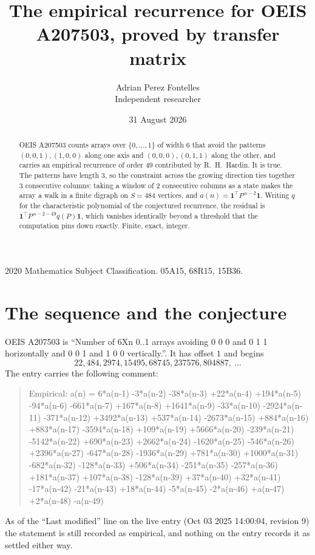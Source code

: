 \documentclass[11pt,a4paper]{article}
\title{The empirical recurrence for OEIS A207503, proved by transfer matrix}
\author{Adrian Perez Fontelles\\ \small Independent researcher}
\date{31 August 2026}
\theoremstyle{plain}
\theoremstyle{definition}
\begin{document}
\maketitle

\begin{abstract}
OEIS A207503 counts arrays over $\{0,\dots,1\}$ of width $6$ that avoid the patterns
$(0,0,1), (1,0,0)$ along one axis and $(0,0,0), (0,1,1)$ along the other, and carries an empirical recurrence of
order $49$ contributed by R.~H.~Hardin. It is true. The patterns have length $3$, so
the constraint across the growing direction ties together $3$ consecutive columns: taking a
window of $2$ consecutive columns as a state makes the array a walk in a finite digraph
on $S=484$ vertices, and $a(n)=\mathbf{1}^{\!\top}P^{\,n-2}\mathbf{1}$. Writing $q$
for the characteristic polynomial of the conjectured recurrence, the residual is
$\mathbf{1}^{\!\top}P^{\,n-2-49}q(P)\mathbf{1}$, which vanishes identically
beyond a threshold that the computation pins down exactly. Finite, exact, integer.
\end{abstract}

\noindent\small 2020 Mathematics Subject Classification. 05A15, 68R15, 15B36.\normalsize

\section{The sequence and the conjecture}

OEIS A207503 is ``Number of 6Xn 0..1 arrays avoiding 0 0 0 and 0 1 1 horizontally and 0 0 1 and 1 0 0 vertically.''. It has offset
$1$ and begins
\[
22, 484, 2974, 15495, 68745, 237576, 804887,\ \dots
\]
The entry carries the following comment:
\begin{quote}\small
Empirical: a(n) = 6*a(n-1) -3*a(n-2) -38*a(n-3) +22*a(n-4) +194*a(n-5) -94*a(n-6) -661*a(n-7) +167*a(n-8) +1641*a(n-9) -33*a(n-10) -2924*a(n-11) -371*a(n-12) +3492*a(n-13) +537*a(n-14) -2673*a(n-15) +884*a(n-16) +883*a(n-17) -3594*a(n-18) +109*a(n-19) +5666*a(n-20) -239*a(n-21) -5142*a(n-22) +690*a(n-23) +2662*a(n-24) -1620*a(n-25) -546*a(n-26) +2396*a(n-27) -647*a(n-28) -1936*a(n-29) +781*a(n-30) +1000*a(n-31) -682*a(n-32) -128*a(n-33) +506*a(n-34) -251*a(n-35) -257*a(n-36) +181*a(n-37) +107*a(n-38) -128*a(n-39) +37*a(n-40) +32*a(n-41) -17*a(n-42) -21*a(n-43) +18*a(n-44) -5*a(n-45) -2*a(n-46) +a(n-47) +2*a(n-48) -a(n-49)
\end{quote}
As of the ``Last modified'' line on the live entry (Oct 03 2025 14:00:04, revision
9) the statement is still recorded as empirical, and nothing on the entry
records it as settled either way.
\end{document}
